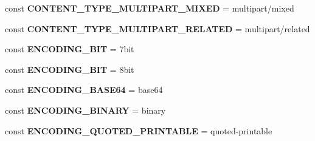 \begin{DoxyCompactItemize}
\item 
\mbox{\label{classPHPMailer_1_1PHPMailer_1_1PHPMailer_ac7f40e7a45a5fb3c6f8c70c267249408}} 
const {\bfseries C\+O\+N\+T\+E\+N\+T\+\_\+\+T\+Y\+P\+E\+\_\+\+M\+U\+L\+T\+I\+P\+A\+R\+T\+\_\+\+M\+I\+X\+ED} = \textquotesingle{}multipart/mixed\textquotesingle{}
\item 
\mbox{\label{classPHPMailer_1_1PHPMailer_1_1PHPMailer_a4d482f70d71d415f2b51768c7b588155}} 
const {\bfseries C\+O\+N\+T\+E\+N\+T\+\_\+\+T\+Y\+P\+E\+\_\+\+M\+U\+L\+T\+I\+P\+A\+R\+T\+\_\+\+R\+E\+L\+A\+T\+ED} = \textquotesingle{}multipart/related\textquotesingle{}
\item 
\mbox{\label{classPHPMailer_1_1PHPMailer_1_1PHPMailer_a2360d0b8fbc95e93ed5fa0f28b70d8c0}} 
const {\bfseries E\+N\+C\+O\+D\+I\+N\+G\+\_\+B\+IT} = \textquotesingle{}7bit\textquotesingle{}
\item 
\mbox{\label{classPHPMailer_1_1PHPMailer_1_1PHPMailer_ad1e82a43b47e0badc99eebea0a5ac83f}} 
const {\bfseries E\+N\+C\+O\+D\+I\+N\+G\+\_\+B\+IT} = \textquotesingle{}8bit\textquotesingle{}
\item 
\mbox{\label{classPHPMailer_1_1PHPMailer_1_1PHPMailer_a05746b54063edb7ee2547164d73c3d96}} 
const {\bfseries E\+N\+C\+O\+D\+I\+N\+G\+\_\+\+B\+A\+S\+E64} = \textquotesingle{}base64\textquotesingle{}
\item 
\mbox{\label{classPHPMailer_1_1PHPMailer_1_1PHPMailer_adff19061934cb1a20740b5abee1920ca}} 
const {\bfseries E\+N\+C\+O\+D\+I\+N\+G\+\_\+\+B\+I\+N\+A\+RY} = \textquotesingle{}binary\textquotesingle{}
\item 
\mbox{\label{classPHPMailer_1_1PHPMailer_1_1PHPMailer_a55bfd5c0778354dc6e094805652c6de1}} 
const {\bfseries E\+N\+C\+O\+D\+I\+N\+G\+\_\+\+Q\+U\+O\+T\+E\+D\+\_\+\+P\+R\+I\+N\+T\+A\+B\+LE} = \textquotesingle{}quoted-\/printable\textquotesingle{}
\item 
\mbox{\label{classPHPMailer_1_1PHPMailer_1_1PHPMailer_a28679a6ee7d66572b5a4cc21f102e179}} 

\end{DoxyCompactItemize}
